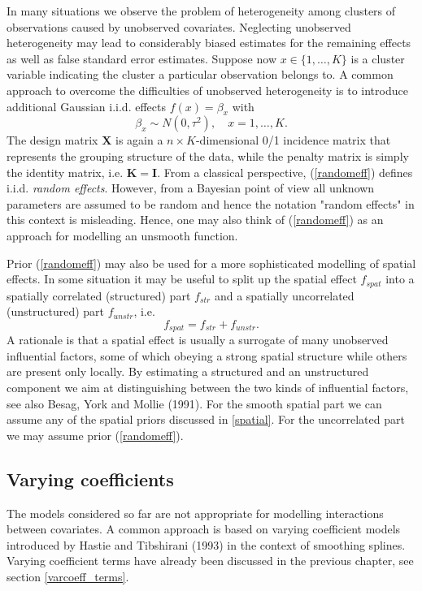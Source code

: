 \documentclass[11pt,a4paper,twoside]{bayesxarticle}
\def \Kvec {\vec{K}}
\def \Kvec {\mathbf{K}}
\def \Ivec {\mathbf{I}}
\def \Xvec {\mathbf{X}}
\begin{document}
In many situations we observe the problem of heterogeneity among
clusters of observations caused by unobserved covariates. Neglecting
unobserved heterogeneity may lead to considerably biased estimates
for the remaining effects as well as false standard error estimates.
Suppose now $x \in \{1,\dots,K\}$ is a cluster variable indicating the
cluster a particular observation belongs to. A common approach to
overcome the difficulties of unobserved heterogeneity is to
introduce additional Gaussian i.i.d. effects $f(x) = \beta_{x}$
with
\begin{equation}
\label{randomeff} \beta_{x} \sim N(0,\tau^2), \quad
x=1,\dots,K.
\end{equation}
The design matrix $\Xvec$ is again a $n \times K$-dimensional 0/1
incidence matrix that represents the grouping structure of the data,
while the penalty matrix is simply the identity matrix, i.e.
$\Kvec=\Ivec$. From a classical perspective, (\ref{randomeff}) defines
i.i.d. {\em random effects}. However, from a Bayesian point of view
all unknown parameters are assumed to be random and hence the
notation "random effects" in this context is misleading. Hence, one
may also think of (\ref{randomeff}) as an approach for modelling an
unsmooth function.

Prior (\ref{randomeff}) may also be used for a more sophisticated
modelling of spatial effects. In some situation it may be useful to
split up the spatial effect $f_{spat}$ into a spatially correlated
(structured) part $f_{str}$ and a spatially uncorrelated
(unstructured) part $f_{unstr}$, i.e.
$$
f_{spat} = f_{str}+f_{unstr}.
$$
A rationale is that a spatial effect is usually a surrogate of many
unobserved influential factors, some of which obeying a strong
spatial structure while others are present only locally. By
estimating a structured and an unstructured component we aim at
distinguishing between the two kinds of influential factors, see
also Besag, York and Mollie (1991). For the smooth spatial part we
can assume any of the spatial priors discussed in \autoref{spatial}.
For the uncorrelated part we may assume prior (\ref{randomeff}).

\subsection{Varying coefficients}

The models considered so far are not appropriate for modelling
interactions between covariates. A common approach is based on
varying coefficient models introduced by Hastie and Tibshirani
(1993) in the context of smoothing splines. Varying coefficient
terms have already been discussed in the previous chapter, see
section \ref{varcoeff_terms}.
\end{document}
